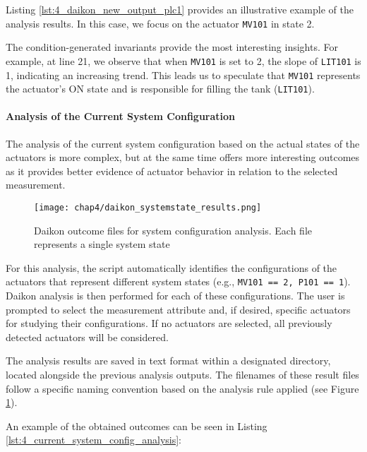 Listing \ref{lst:4_daikon_new_output_plc1} provides an illustrative example of the analysis results. In this case, we focus on the actuator \texttt{MV101} in state 2.
 
The condition-generated invariants provide the most interesting insights. For example, at line 21, we observe that when \texttt{MV101} is set to 2, the slope of \texttt{LIT101} is 1, indicating an increasing trend. This leads us to speculate that \texttt{MV101} represents the actuator's ON state and is responsible for filling the tank (\texttt{LIT101}).

\paragraph{Analysis of the Current System Configuration}
\label{par:4_current_system_config_analysis}
The analysis of the current system configuration based on the actual states of the actuators is more complex, but at the same time offers more interesting outcomes as it provides better evidence of actuator behavior in relation to the selected measurement.

\begin{figure}[ht]
	\centering
	\texttt{[image: chap4/daikon\_systemstate\_results.png]}
	\caption{Daikon outcome files for system configuration analysis. Each file represents a single system state}
	\label{fig:4_daikon_systemstates_files}
\end{figure}

\noindent For this analysis, the script automatically identifies the configurations of the actuators that represent different system states (e.g., \texttt{MV101 == 2, P101 == 1}). Daikon analysis is then performed for each of these configurations. The user is prompted to select the measurement attribute and, if desired, specific actuators for studying their configurations. If no actuators are selected, all previously detected actuators will be considered.

The analysis results are saved in text format within a designated directory, located alongside the previous analysis outputs. The filenames of these result files follow a specific naming convention based on the analysis rule applied (see Figure \ref{fig:4_daikon_systemstates_files}).

\noindent An example of the obtained outcomes can be seen in Listing \ref{lst:4_current_system_config_analysis}:

